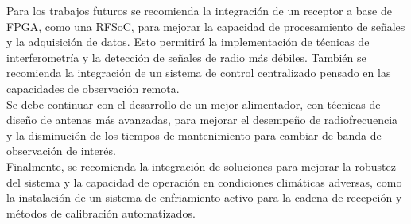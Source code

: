 Para los trabajos futuros se recomienda la integración de un receptor a base de FPGA, como una RFSoC, para mejorar la capacidad de procesamiento de señales y la adquisición de datos. Esto permitirá la implementación de técnicas de interferometría y la detección de señales de radio más débiles. También se recomienda la integración de un sistema de control centralizado pensado en las capacidades de observación remota.\\

Se debe continuar con el desarrollo de un mejor alimentador, con técnicas de diseño de antenas más avanzadas, para mejorar el desempeño de radiofrecuencia y la disminución de los tiempos de mantenimiento para cambiar de banda de observación de interés.\\

Finalmente, se recomienda la integración de soluciones para mejorar la robustez del sistema y la capacidad de operación en condiciones climáticas adversas, como la instalación de un sistema de enfriamiento activo para la cadena de recepción y métodos de calibración automatizados.\\